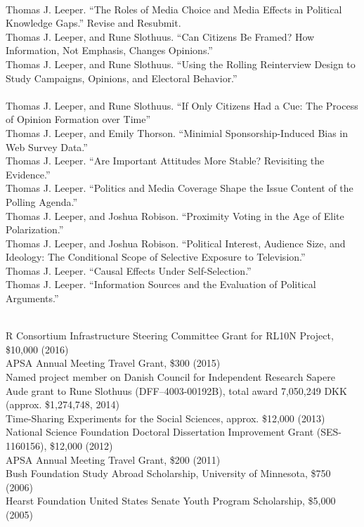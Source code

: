 \documentclass[12pt]{article}
\renewcommand{\section}[1]{\pagebreak[3]%
    \llap{\scshape\smash{\parbox[t]{\marginparwidth}{\raggedright {\color{lg}#1}}}}%
    \vspace{-\baselineskip}\par}
\newcommand{\topic}[1]{\pagebreak[3]\indent {\color{lg}{\footnotesize #1 }}\\}
\newcommand{\entry}[1]{\indent {\color{lg}\guillemotright}\hspace{2pt}#1\vspace{.25em}\\}
\begin{document}
\section{Working Papers\\ \& Ongoing Projects}
\topic{Papers Under Review}
	\entry{Thomas J. Leeper. ``The Roles of Media Choice and Media Effects in Political Knowledge Gaps.'' Revise and Resubmit.}
	\entry{Thomas J. Leeper, and Rune Slothuus. ``Can Citizens Be Framed? How Information, Not Emphasis, Changes Opinions.''}
	\entry{Thomas J. Leeper, and Rune Slothuus. ``Using the Rolling Reinterview Design to Study Campaigns, Opinions, and Electoral Behavior.''}

\topic{Working Papers}
	\entry{Thomas J. Leeper, and Rune Slothuus. ``If Only Citizens Had a Cue: The Process of Opinion Formation over Time''}
	\entry{Thomas J. Leeper, and Emily Thorson. ``Minimial Sponsorship-Induced Bias in Web Survey Data.''}
	\entry{Thomas J. Leeper. ``Are Important Attitudes More Stable? Revisiting the Evidence.''}
	\entry{Thomas J. Leeper. ``Politics and Media Coverage Shape the Issue Content of the Polling Agenda.''}
	\entry{Thomas J. Leeper, and Joshua Robison. ``Proximity Voting in the Age of Elite Polarization.''}
	\entry{Thomas J. Leeper, and Joshua Robison. ``Political Interest, Audience Size, and Ideology: The Conditional Scope of Selective Exposure to Television.''}
	\entry{Thomas J. Leeper. ``Causal Effects Under Self-Selection.''}
	\entry{Thomas J. Leeper. ``Information Sources and the Evaluation of Political Arguments.''}

\section{Grants \&\\Funding}
\topic{External Sources}
	\entry{R Consortium Infrastructure Steering Committee Grant for RL10N Project, \$10,000 (2016)}
	\entry{APSA Annual Meeting Travel Grant, \$300 (2015)}
	\entry{Named project member on Danish Council for Independent Research Sapere Aude grant to Rune Slothuus (DFF--4003-00192B), total award 7,050,249 DKK (approx. \$1,274,748, 2014)}
	\entry{Time-Sharing Experiments for the Social Sciences, approx. \$12,000 (2013)}
	\entry{National Science Foundation Doctoral Dissertation Improvement Grant (SES-1160156), \$12,000 (2012)}
	\entry{APSA Annual Meeting Travel Grant, \$200 (2011)}
	\entry{Bush Foundation Study Abroad Scholarship, University of Minnesota, \$750 (2006)}
	\entry{Hearst Foundation United States Senate Youth Program Scholarship, \$5,000 (2005)}
	
\end{document}
